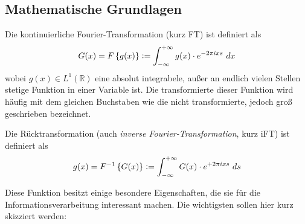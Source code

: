 
\subsection{Mathematische Grundlagen}

Die kontinuierliche Fourier-Transformation (kurz FT) ist definiert als
\begin{equation}
	G(x) = F\left\{g(x)\right\}\vcentcolon=\int_{-\infty}^{+\infty} g(x) \cdot e^{-2\pi i x s} ~dx
	\label{eq:ft}
\end{equation}
wobei $g(x)\in L^1(\mathbb{R})$ eine absolut integrabele, außer an endlich vielen Stellen stetige Funktion in einer Variable ist. Die transformierte dieser Funktion wird häufig mit dem gleichen Buchstaben wie die nicht transformierte, jedoch groß geschrieben bezeichnet.

Die Rücktransformation (auch \textit{inverse Fourier-Transformation}, kurz iFT) ist definiert als
\begin{equation}
	g(x) = F^{-1}\left\{G(x)\right\}\vcentcolon=\int_{-\infty}^{+\infty} G(x) \cdot e^{+2\pi i x s} ~ds
	\label{eq:ift}
\end{equation}

Diese Funktion besitzt einige besondere Eigenschaften, die sie für die Informationsverarbeitung interessant machen. Die wichtigsten sollen hier kurz skizziert werden:


